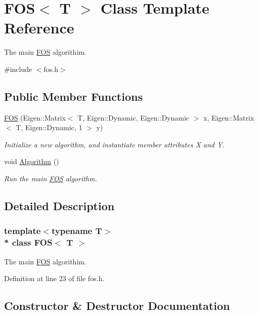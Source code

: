\hypertarget{class_f_o_s}{}\section{F\+OS$<$ T $>$ Class Template Reference}
\label{class_f_o_s}


The main \hyperlink{class_f_o_s}{F\+OS} algorithim.  




{\ttfamily \#include $<$fos.\+h$>$}

\subsection*{Public Member Functions}
\begin{DoxyCompactItemize}
\item 
\hyperlink{class_f_o_s_afe9890a8ccc16999cb8175539ae6eedd}{F\+OS} (Eigen\+::\+Matrix$<$ T, Eigen\+::\+Dynamic, Eigen\+::\+Dynamic $>$ x, Eigen\+::\+Matrix$<$ T, Eigen\+::\+Dynamic, 1 $>$ y)
\begin{DoxyCompactList}\small\item\em Initialize a new algorithm, and instantiate member attributes X and Y. \end{DoxyCompactList}\item 
void \hyperlink{class_f_o_s_a18a5f85f95eb2cefe26fb25d13127c38}{Algorithm} ()
\begin{DoxyCompactList}\small\item\em Run the main \hyperlink{class_f_o_s}{F\+OS} algorithm. \end{DoxyCompactList}\end{DoxyCompactItemize}


\subsection{Detailed Description}
\subsubsection*{template$<$typename T$>$\\*
class F\+O\+S$<$ T $>$}

The main \hyperlink{class_f_o_s}{F\+OS} algorithim. 

Definition at line 23 of file fos.\+h.



\subsection{Constructor \& Destructor Documentation}
